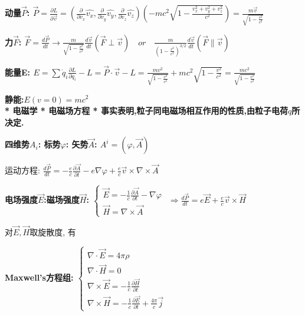         \bf{动量$\vec P$}:
            $\vec P = \frac{\partial L}{\partial \vec v}= (\frac{\partial}{\partial v_x} \hat{v_x}, \frac{\partial}{\partial v_y} \hat{v_y}, \frac{\partial}{\partial v_z} \hat{v_z})(-m c^2 \sqrt{1 - \frac{v_x^2 + v_y^2 + v_z^2}{c^2}}) = \frac{m \vec v}{\sqrt{1 - \frac{v^2}{c^2}}}$
        
        \bf{力$\vec F$}:
            $\vec F = \frac{d\vec P}{dt} \to \frac{m}{\sqrt{1 - \frac{v^2}{c^2}}} \frac{d\vec v}{dt}(\vec F \perp \vec v) \quad or\quad  \frac{m}{(1 - \frac{v^2}{c^2})^{3/2}} \frac{d\vec v}{dt} (\vec F \parallel \vec v)$
    
        \bf{能量E}:
            $E = \sum \dot q_i \frac{\partial L}{\partial \dot q_i} - L = \vec P \cdot \vec v - L = \frac{m v^2}{\sqrt{1 - \frac{v^2}{c^2}}} + m c^2 \sqrt{1 - \frac{v^2}{c^2}} = \frac{mc^2}{\sqrt{1 - \frac{v^2}{c^2}}}$
    
        \bf{静能}:\quad $E(v=0) = m c^2$\\


* 电磁学
    * 电磁场方程
        * 事实表明,粒子同电磁场相互作用的性质,由粒子电荷$q$所决定.
    
        \bf{四维势$A_{i}$: \quad 标势$\varphi$: \quad 矢势$\vec A$:}
            $A^{i}=(\varphi,\vec A)$
            
        运动方程:
            $\frac{d\vec P}{dt} = - \frac{e}{c} \frac{\partial\vec A}{\partial t} - e \nabla \varphi + \frac{e}{c} \vec v \times \nabla \times \vec A$
            
        \bf{电场强度$\vec E$:\quad 磁场强度$\vec H$:}
            $
                \left\{ \begin{array}{ll}
                \vec E = -\frac{1}{c} \frac{\partial \vec A}{\partial t} - \nabla \varphi\\
                \vec H = \nabla \times \vec A
                \end{array} \right.
            $
            $\Rightarrow \frac{d\vec P}{dt} = e \vec E + \frac{e}{c} \vec v \times \vec H$
            
        对$\vec E,\vec H$取旋散度, 有
        
        \bf{Maxwell's方程组}:
            $
                \left\{ \begin{array}{ll}
                \nabla \cdot \vec E = 4\pi\rho\\
                \nabla \cdot \vec H = 0\\
                \nabla \times \vec E = - \frac{1}{c} \frac{\partial \vec H}{\partial t}\\
                \nabla \times \vec H = - \frac{1}{c} \frac{\partial \vec E}{\partial t} + \frac{4\pi}{c}\vec j
                \end{array} \right.
            $


